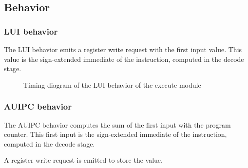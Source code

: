 

  \subsection{Behavior}

    \subsubsection{LUI behavior}

      \begin{content}
          The LUI behavior emits a register write request with the first input value. This value is the sign-extended immediate of the instruction, computed in the decode stage.
        \end{content}

      \begin{figure}[H]
          \centering
          
          \caption{Timing diagram of the LUI behavior of the execute module}
          \label{fig:exm-behavior-lui}
        \end{figure}

    \subsubsection{AUIPC behavior}

      \begin{content}
          The AUIPC behavior computes the sum of the first input with the program counter. This first input is the sign-extended immediate of the instruction, computed in the decode stage.
          
          A register write request is emitted to store the value.
        \end{content}

